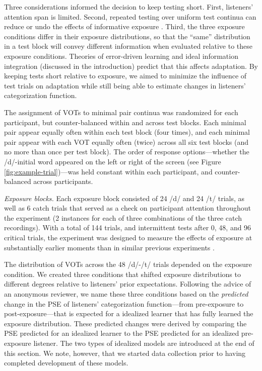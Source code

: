 \documentclass[
  11pt,
  man,mask,floatsintext]{apa6}
\begin{document}
Three considerations informed the decision to keep testing short. First, listeners' attention span is limited. Second, repeated testing over uniform test continua can reduce or undo the effects of informative exposure \autocite{cummings-theodore2023,zheng-samuel2023,liu-jaeger2018,liu-jaeger2019,giovannone-theodore2021,tzeng2021}. Third, the three exposure conditions differ in their exposure distributions, so that the ``same'' distribution in a test block will convey different information when evaluated relative to these exposure conditions. Theories of error-driven learning and ideal information integration (discussed in the introduction) predict that this affects adaptation. By keeping tests short relative to exposure, we aimed to minimize the influence of test trials on adaptation while still being able to estimate changes in listeners' categorization function.

The assignment of VOTs to minimal pair continua was randomized for each participant, but counter-balanced within and across test blocks. Each minimal pair appear equally often within each test block (four times), and each minimal pair appear with each VOT equally often (twice) across all six test blocks (and no more than once per test block). The order of response options---whether the /d/-initial word appeared on the left or right of the screen (see Figure \ref{fig:example-trial})---was held constant within each participant, and counter-balanced across participants.

\emph{Exposure blocks. } Each exposure block consisted of 24 /d/ and 24 /t/ trials, as well as 6 catch trials that served as a check on participant attention throughout the experiment (2 instances for each of three combinations of the three catch recordings). With a total of 144 trials, and intermittent tests after 0, 48, and 96 critical trials, the experiment was designed to measure the effects of exposure at substantially earlier moments than in similar previous experiments \autocites[cf.~\textgreater200 critical trials in][]{clayards2008,kleinschmidt2020,theodore-monto2019,nixon2016}.

The distribution of VOTs across the 48 /d/-/t/ trials depended on the exposure condition. We created three conditions that shifted exposure distributions to different degrees relative to listeners' prior expectations. Following the advice of an anonymous reviewer, we name these three conditions based on the \emph{predicted} change in the PSE of listeners' categorization function---from pre-exposure to post-exposure---that is expected for a idealized learner that has fully learned the exposure distribution. These predicted changes were derived by comparing the PSE predicted for an idealized learner to the PSE predicted for an idealized pre-exposure listener. The two types of idealized models are introduced at the end of this section. We note, however, that we started data collection prior to having completed development of these models.
\end{document}
